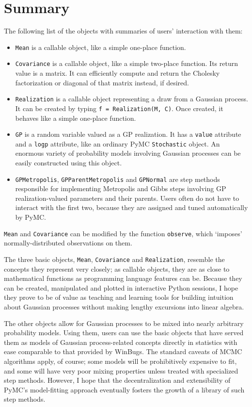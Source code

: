 \documentclass{report}
\begin{document}
\chapter{Summary}
The following list of the objects with summaries of users' interaction with them:
\begin{itemize}
    \item \texttt{Mean} is a callable object, like a simple one-place function.
    \item \texttt{Covariance} is a callable object, like a simple two-place function. Its return value is a matrix. It can efficiently compute and return the Cholesky factorization or diagonal of that matrix instead, if desired.
    \item \texttt{Realization} is a callable object representing a draw from a Gaussian process. It can be created by typing \texttt{f = Realization(M, C)}. Once created, it behaves like a simple one-place function.
    \item \texttt{GP} is a random variable valued as a GP realization. It has a \texttt{value} attribute and a \texttt{logp} attribute, like an ordinary PyMC \texttt{Stochastic} object. An enormous variety of probability models involving Gaussian processes can be easily constructed using this object.
    \item \texttt{GPMetropolis}, \texttt{GPParentMetropolis} and \texttt{GPNormal} are step methods responsible for implementing Metropolis and Gibbs steps involving GP realization-valued parameters and their parents. Users often do not have to interact with the first two, because they are assigned and tuned automatically by PyMC.
\end{itemize}
\texttt{Mean} and \texttt{Covariance} can be modified by the function \texttt{observe}, which `imposes' normally-distributed observations on them.

The three basic objects, \texttt{Mean}, \texttt{Covariance} and \texttt{Realization}, resemble the concepts they represent very closely; as callable objects, they are as close to mathematical functions as programming language features can be. Because they can be created, manipulated and plotted in interactive Python sessions, I hope they prove to be of value as teaching and learning tools for building intuition about Gaussian processes without making lengthy excursions into linear algebra.

The other objects allow for Gaussian processes to be mixed into nearly arbitrary probability models. Using them, users can use the basic objects that have served them as models of Gaussian process-related concepts directly in statistics with ease comparable to that provided by WinBugs. The standard caveats of MCMC algorithms apply, of course; some models will be prohibitively expensive to fit, and some will have very poor mixing properties unless treated with specialized step methods. However, I hope that the decentralization and extensibility of PyMC's model-fitting approach eventually fosters the growth of a library of such step methods.



\end{document}
